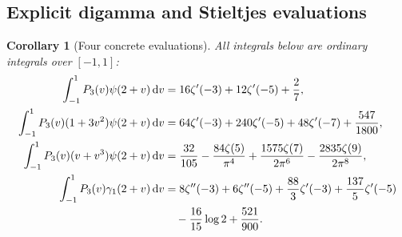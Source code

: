 \documentclass[11pt]{article}
\numberwithin{equation}{section}
\newtheorem{corollary}[theorem]{Corollary}
\theoremstyle{definition}\newtheorem{definition}[theorem]{Definition}
\theoremstyle{remark}\newtheorem{remark}[theorem]{Remark}
\newcommand{\dd}{\,\mathrm d}
\begin{document}
\subsection{Explicit digamma and Stieltjes evaluations}
\begin{corollary}[Four concrete evaluations]\label{cor:four-integrals}
All integrals below are ordinary integrals over $[-1,1]$:
\begin{align}
 \int_{-1}^1P_3(v)\psi(2+v)\dd v
 &=16\zeta'(-3)+12\zeta'(-5)+\frac27,
 \label{eq:I-psi-base}\\
 \int_{-1}^1P_3(v)(1+3v^2)\psi(2+v)\dd v
 &=64\zeta'(-3)+240\zeta'(-5)+48\zeta'(-7)
       +\frac{547}{1800},\label{eq:I-psi-mixed}\\
 \int_{-1}^1P_3(v)(v+v^3)\psi(2+v)\dd v
 &=\frac{32}{105}-\frac{84\zeta(5)}{\pi^4}
   +\frac{1575\zeta(7)}{2\pi^6}-\frac{2835\zeta(9)}{2\pi^8},
 \label{eq:I-psi-odd}\\
 \int_{-1}^1P_3(v)\gamma_1(2+v)\dd v
 &=8\zeta''(-3)+6\zeta''(-5)+\frac{88}{3}\zeta'(-3)
   +\frac{137}{5}\zeta'(-5)\notag\\
 &\hspace{1em}-\frac{16}{15}\log2+\frac{521}{900}.
 \label{eq:I-stieltjes}
\end{align}
\end{corollary}
\end{document}
